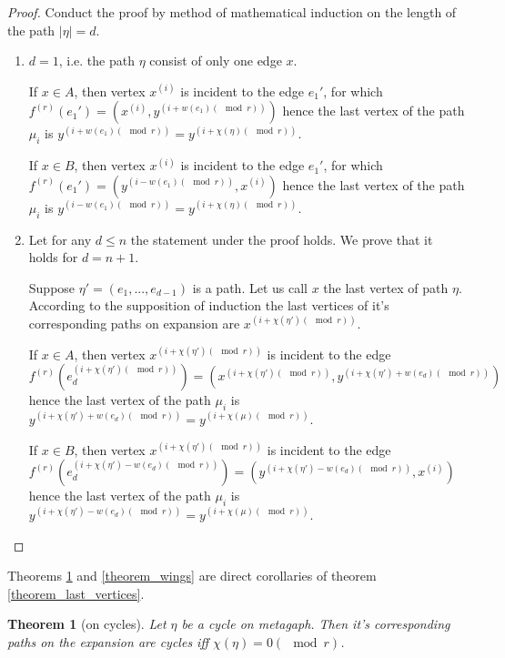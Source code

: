 \documentclass[a4paper,fleqn]{cas-sc}
\newtheorem{theorem}{Theorem}
\begin{document}
\begin{proof}
    Conduct the proof by method of mathematical induction on the length of the path $|\eta| = d$.
    
    \begin{enumerate}
    \item $d = 1$, i.e. the path $\eta$ consist of only one edge $x$.
    
    If $x \in A$, then vertex $x^{(i)}$ is incident to the edge $e_1'$, for which $f^{(r)}(e_1') = (x^{(i)}, y^{(i + w(e_1) (\mod{r}))})$ hence the last vertex of the path $\mu_i$ is $y^{(i + w(e_1) (\mod{r}))} = y^{(i + \chi(\eta) (\mod{r}))}$.
    
    If $x \in B$, then vertex $x^{(i)}$ is incident to the edge $e_1'$, for which $f^{(r)}(e_1') = (y^{(i - w(e_1) (\mod{r}))}, x^{(i)})$ hence the last vertex of the path $\mu_i$ is $y^{(i - w(e_1) (\mod{r}))} = y^{(i + \chi(\eta) (\mod{r}))}$.
    
    \item Let for any $d \leq n$ the statement under the proof holds. We prove that it holds for $d = n + 1$.

    Suppose $\eta' = (e_1, ..., e_{d - 1})$ is a path. Let us call $x$ the last vertex of path $\eta$. According to the supposition of induction the last vertices of it's corresponding paths on expansion are $x^{(i + \chi(\eta')(\mod{r}))}$.
    
    If $x \in A$, then vertex $x^{(i + \chi(\eta')(\mod{r}))}$ is incident to the edge $f^{(r)}(e_d^{(i + \chi(\eta')(\mod{r}))}) = (x^{(i + \chi(\eta')(\mod{r}))}, y^{(i + \chi(\eta') + w(e_d) (\mod{r}))})$ hence the last vertex of the path $\mu_i$ is $y^{(i + \chi(\eta') + w(e_d) (\mod{r}))} = y^{(i + \chi(\mu) (\mod{r}))}$.
    
    If $x \in B$, then vertex $x^{(i + \chi(\eta')(\mod{r}))}$ is incident to the edge $f^{(r)}(e_d^{(i + \chi(\eta') - w(e_d) (\mod{r}))}) = (y^{(i + \chi(\eta') - w(e_d) (\mod{r}))}, x^{(i)})$ hence the last vertex of the path $\mu_i$ is $y^{(i + \chi(\eta') - w(e_d) (\mod{r}))} = y^{(i + \chi(\mu) (\mod{r}))}$.  
    
    \end{enumerate}  
\end{proof}

Theorems \ref{theorem_cycles} and \ref{theorem_wings} are direct corollaries of theorem \ref{theorem_last_vertices}.

\begin{theorem}[on cycles]\label{theorem_cycles}
    Let $\eta$ be a cycle on metagaph. Then it's corresponding paths on the expansion are cycles iff $\chi(\eta) = 0 (\mod{r})$.
\end{theorem}
\end{document}
